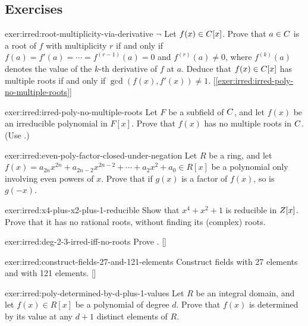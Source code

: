 \subsection*{Exercises}
\begin{exer}{}{exer:irred:root-multiplicity-via-derivative}
  $\lnot$ Let $f(x) \in C[x]$. Prove that $a \in C$ is a root of $f$
  with multiplicity $r$ if and only if
  $f(a) = f'(a) = \cdots = f^{(r-1)}(a) = 0$ and $f^{(r)}(a) \neq 0$,
  where $f^{(k)}(a)$ denotes the value of the $k$-th derivative of $f$
  at $a$. Deduce that $f(x) \in C[x]$ has multiple roots if and only
  if $\gcd(f(x), f'(x)) \neq
  1$. [\ref{exer:irred:irred-poly-no-multiple-roots}]
\end{exer}
\begin{exer}{}{exer:irred:irred-poly-no-multiple-roots}
  Let $F$ be a subfield of $C$, and let $f(x)$ be an irreducible
  polynomial in $F[x]$. Prove that $f(x)$ has no multiple roots in
  $C$. (Use
  .)
\end{exer}
\begin{exer}{}{exer:irred:even-poly-factor-closed-under-negation}
  Let $R$ be a ring, and let
  $f(x) = a_{2n} x^{2n} + a_{2n-2} x^{2n-2} + \cdots + a_2 x^2 + a_0
  \in R[x]$ be a polynomial only involving even powers of $x$. Prove
  that if $g(x)$ is a factor of $f(x)$, so is $g(-x)$.
\end{exer}
\begin{exer}{}{exer:irred:x4-plus-x2-plus-1-reducible}
  Show that $x^4 + x^2 + 1$ is reducible in $Z[x]$. Prove that it has
  no rational roots, without finding its (complex) roots.
\end{exer}
\begin{exer}{}{exer:irred:deg-2-3-irred-iff-no-roots}
  \exerused{} Prove
  . []
\end{exer}
\begin{exer}{}{exer:irred:construct-fields-27-and-121-elements}
  \exerused{} Construct fields with 27 elements and with 121 elements.
  []
\end{exer}
\begin{exer}{}{exer:irred:poly-determined-by-d-plus-1-values}
  Let $R$ be an integral domain, and let $f(x) \in R[x]$ be a
  polynomial of degree $d$. Prove that $f(x)$ is determined by its
  value at any $d + 1$ distinct elements of $R$.
\end{exer}
